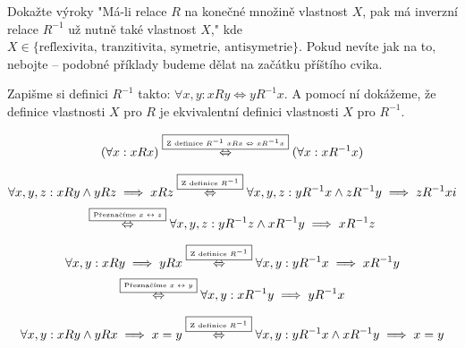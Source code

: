 \documentclass[12pt]{article}					%
\begin{document}
    
\begin{priklad}
    Dokažte výroky "Má-li relace $R$ na konečné množině vlastnost $X$, pak má inverzní relace $R^{-1}$ už nutně také vlastnost $X$," kde $X \in \{ \text{reflexivita, tranzitivita, symetrie, antisymetrie}\}$. Pokud nevíte jak na to, nebojte – podobné příklady budeme dělat na začátku příštího cvika.

    Zapišme si definici $R^{-1}$ takto: $ \forall x,y: xRy \Leftrightarrow yR^{-1}x$. A pomocí ní dokážeme, že definice vlastnosti $X$ pro $R$ je ekvivalentní definici vlastnosti $X$ pro $R^{-1}$.

    \begin{dukazin}[Reflexivita]
            $$ (\forall x: xRx) \overset{\raise 3pt \hbox{\framebox{\text{\tiny Z definice $R^{-1}$ $xRx \Leftrightarrow xR^{-1}x$}}}}{\Leftrightarrow} (\forall x: xR^{-1}x) $$
    \end{dukazin}

    \begin{dukazin}[Tranzitivita]
            $$ \forall x, y, z: xRy \land yRz \implies xRz \overset{\raise 3pt \hbox{\framebox{\text{\tiny Z definice $R^{-1}$}}}}{\Leftrightarrow} \forall x, y, z: yR^{-1}x \land zR^{-1}y \implies zR^{-1}xi $$
    $$ \overset{\raise 3pt \hbox{\framebox{\text{\tiny Přeznačíme $x \leftrightarrow z$}}}}{\Leftrightarrow} \forall x, y, z: yR^{-1}z \land xR^{-1}y \implies xR^{-1}z $$
    \end{dukazin}

    \begin{dukazin}[Symetrie]
            $$ \forall x, y: xRy \implies yRx \overset{\raise 3pt \hbox{\framebox{\text{\tiny Z definice $R^{-1}$}}}}{\Leftrightarrow} \forall x, y: yR^{-1}x \implies xR^{-1}y $$
        $$ \overset{\raise 3pt \hbox{\framebox{\text{\tiny Přeznačíme $x \leftrightarrow y$}}}}{\Leftrightarrow} \forall x, y: xR^{-1}y \implies yR^{-1}x$$ 
    \end{dukazin}

    \begin{dukazin}[Antisymetrie]
            $$ \forall x, y: xRy \land yRx \implies x = y \overset{\text{\raise 3pt \hbox{\framebox{\tiny Z definice $R^{-1}$}}}}{\Leftrightarrow} \forall x, y: yR^{-1}x \land xR^{-1}y \implies x = y$$
    \end{dukazin}
\end{priklad}
\end{document}
